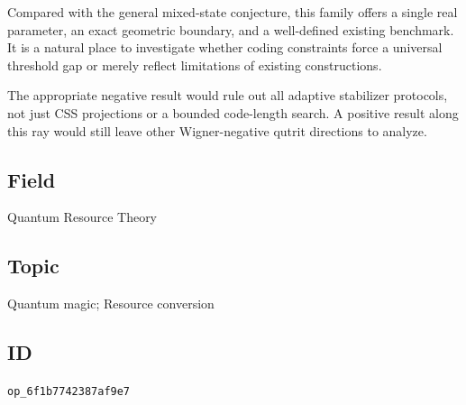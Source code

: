 Compared with the general mixed-state conjecture, this family offers a single real parameter, an exact geometric boundary, and a well-defined existing benchmark. It is a natural place to investigate whether coding constraints force a universal threshold gap or merely reflect limitations of existing constructions.

The appropriate negative result would rule out all adaptive stabilizer protocols, not just CSS projections or a bounded code-length search. A positive result along this ray would still leave other Wigner-negative qutrit directions to analyze.

\subsection*{Field}

Quantum Resource Theory

\subsection*{Topic}

Quantum magic; Resource conversion

\subsection*{ID}

\texttt{op\_6f1b7742387af9e7}
